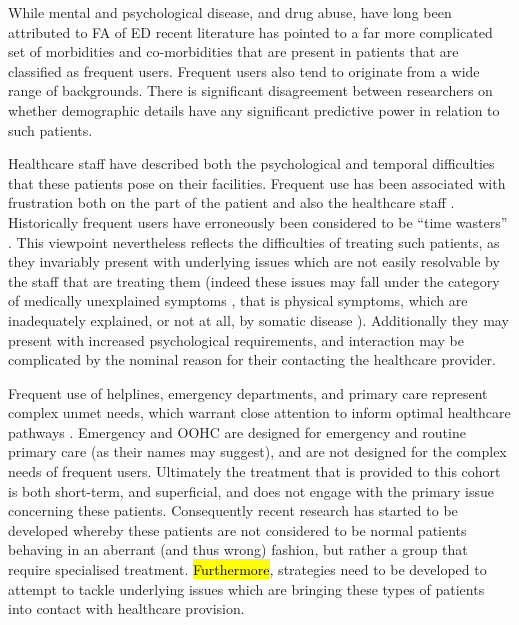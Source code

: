 

While mental and psychological disease, and drug abuse, have long been attributed to FA of ED \cite{malins2016cognitive,byrne2003frequent} recent literature has pointed to a far more complicated set of morbidities and co-morbidities that are present in patients that are classified as frequent users. Frequent users also tend to originate from a wide range of backgrounds. There is significant disagreement between researchers on whether demographic details have any significant predictive power in relation to such patients.  

Healthcare staff have described both the psychological and temporal difficulties that these patients pose on their facilities. Frequent use has been associated with frustration both on the part of the patient and also the healthcare staff \cite{holmstrom2017frequent}.  Historically frequent users have erroneously been considered to be ``time wasters'' \cite{pirkis2016frequent}. This viewpoint nevertheless reflects the difficulties of treating such patients, as they invariably present with underlying issues which are not easily resolvable by the staff that are treating them (indeed these issues may fall under the category of medically unexplained symptoms \cite{baker2013pilot}, that is physical symptoms, which are inadequately explained, or not at all, by somatic disease \cite{creed2011medically}). Additionally they may present with increased  psychological requirements,  and interaction may be complicated by the nominal reason for their contacting the healthcare provider.


Frequent use of helplines, emergency departments, and primary care represent complex unmet needs, which warrant close attention to inform optimal healthcare pathways \cite{daniels2018better,byrne2003frequent,spence2014frequent}.  Emergency and OOHC are designed for emergency and routine primary care (as their names may suggest), and are not designed for the complex needs of frequent users. Ultimately the treatment that is provided to this cohort is both short-term, and superficial, and does not engage with the primary issue concerning these patients. Consequently recent research has started to be developed whereby these patients are not considered to be normal patients behaving in an aberrant (and thus wrong) fashion, but rather a group that require specialised treatment\cite{malins2016cognitive,buja2015determines}. \hl{Furthermore}, strategies need to be developed to attempt to tackle underlying issues which are bringing these types of patients into contact with healthcare provision.  

